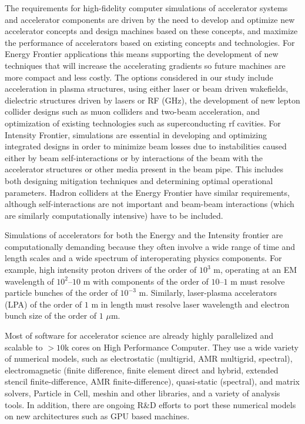 The requirements for high-fidelity computer simulations of accelerator systems and accelerator components are driven by the need to develop and optimize new accelerator concepts and design machines based on these concepts, and maximize the performance of accelerators based on existing concepts and technologies.  For  Energy Frontier applications this means supporting the development of new techniques that will increase the accelerating gradients so future machines are more compact and less costly. The options considered in our study include acceleration in plasma structures, using either laser or beam driven wakefields, dielectric structures driven by lasers or RF (GHz), the development of new lepton collider designs such as muon colliders and two-beam acceleration, and optimization of existing technologies such as superconducting rf cavities. For  Intensity Frontier, simulations are essential in developing and optimizing integrated designs in order to minimize beam losses due to instabilities caused either by beam self-interactions or by interactions of the beam with the accelerator structures or other media present in the beam pipe.  This  includes both designing mitigation techniques and determining optimal operational parameters.  Hadron colliders at the Energy Frontier have similar requirements, although self-interactions are not important and beam-beam interactions (which are similarly computationally intensive) have to be included.  

Simulations of accelerators for both the Energy and the Intensity frontier are computationally demanding because they often involve a wide range of time and length scales and a wide spectrum of interoperating physics components. For example, high intensity proton drivers of the order of $10^3$ m, operating at an EM wavelength of $10^2$--$10$ m with components of the order of $10$--$1$ m must resolve particle bunches of the order of $10^{-3}$ m. Similarly, laser-plasma accelerators (LPA) of the order of $1$ m in length must resolve laser wavelength and electron bunch size of the order of $1$ $\mu$m.

Most of software for accelerator science are already  highly parallelized and scalable to $> 10$k cores on High Performance Computer. They use a wide variety of numerical models, such as electrostatic (multigrid, AMR multigrid, spectral), electromagnetic (finite difference, finite element direct and hybrid, extended stencil finite-difference, AMR finite-difference), quasi-static (spectral), and  matrix solvers, Particle in Cell, meshin and other libraries, and a variety of analysis tools. In addition, there are ongoing R\&D efforts to port these numerical models on new architectures such as GPU based machines.

